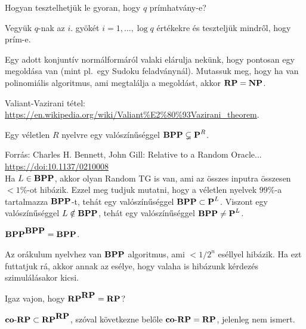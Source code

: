 \begin{Exercise}[counter={sorszam}, difficulty=0]
	Hogyan tesztelhetj\"uk le gyoran, hogy $q$ pr\'imhatv\'any-e?
\end{Exercise}	
\begin{Answer}
	Vegy\"uk $q$-nak az $i.$ gy\"ok\'et $i=1,\ldots,\log q$ \'ert\'ekekre \'es tesztelj\"uk mindr\H ol, hogy pr\'im-e.
\end{Answer}


\begin{Exercise}[counter={sorszam}, difficulty=1]
	Egy adott konjunt\'iv norm\'alform\'ar\'ol valaki el\'arulja nek\"unk, hogy pontosan egy megold\'asa van (mint pl.\ egy Sudoku feladv\'anyn\'al). Mutassuk meg, hogy ha van polinomi\'alis algoritmus, ami megtal\'alja a megold\'ast, akkor $\mbox{\ensuremath{\mathbf{RP}}}=\mbox{\ensuremath{\mathbf{NP}}}$.	
\end{Exercise}	
\begin{Answer}
	Valiant-Vazirani t\'etel: \url{https://en.wikipedia.org/wiki/Valiant%E2%80%93Vazirani_theorem}.
\end{Answer}

\begin{Exercise}[counter={sorszam}, difficulty=0]
	Egy v\'eletlen $R$ nyelvre egy val\'osz\'in\H us\'eggel $\mbox{\ensuremath{\mathbf{BPP}}}\subsetneq \mbox{\ensuremath{\mathbf{P}}}^R$.	
\end{Exercise}	
\begin{Answer}
	Forr\'as: Charles H. Bennett, John Gill: Relative to a Random Oracle... \url{https://doi:10.1137/0210008}\\
	Ha $L\in \mbox{\ensuremath{\mathbf{BPP}}}$, akkor olyan Random TG is van, ami az \"osszes inputra \"osszesen $<1\%$-ot hib\'azik. Ezzel meg tudjuk mutatni, hogy a v\'eletlen nyelvek $99\%$-a tartalmazza $\mbox{\ensuremath{\mathbf{BPP}}}$-t, teh\'at egy val\'osz\'in\H us\'eggel $\mbox{\ensuremath{\mathbf{BPP}}}\subset \mbox{\ensuremath{\mathbf{P}}}^L$. Viszont egy val\'osz\'in\H us\'eggel $L \notin \mbox{\ensuremath{\mathbf{BPP}}}$, teh\'at egy val\'osz\'in\H us\'eggel $\mbox{\ensuremath{\mathbf{BPP}}}\ne \mbox{\ensuremath{\mathbf{P}}}^L$.
\end{Answer}

\begin{Exercise}[counter={sorszam}, difficulty=1]
	$\mbox{\ensuremath{\mathbf{BPP}}}^{\mbox{\ensuremath{\mathbf{BPP}}}}=\mbox{\ensuremath{\mathbf{BPP}}}$.
\end{Exercise}	
\begin{Answer}
	Az or\'akulum nyelvhez van $\mbox{\ensuremath{\mathbf{BPP}}}$ algoritmus, ami $<1/2^n$ es\'ellyel hib\'azik. Ha ezt futtatjuk r\'a, akkor annak az es\'elye, hogy valaha is hib\'azunk k\'erdez\'es szimul\'al\'asakor kicsi.
\end{Answer}

\begin{Exercise}[counter={sorszam}, difficulty=0]
	Igaz vajon, hogy $\mbox{\ensuremath{\mathbf{RP}}}^{\mbox{\ensuremath{\mathbf{RP}}}}=\mbox{\ensuremath{\mathbf{RP}}}$?	
\end{Exercise}	
\begin{Answer}
	$\mbox{\ensuremath{\mathbf{co\text{-}RP}}}\subset \mbox{\ensuremath{\mathbf{RP}}}^{\mbox{\ensuremath{\mathbf{RP}}}}$, sz\'oval k\"ovetkezne bel\H ole $\mbox{\ensuremath{\mathbf{co\text{-}RP}}}=\mbox{\ensuremath{\mathbf{RP}}}$, jelenleg nem ismert.
\end{Answer}

